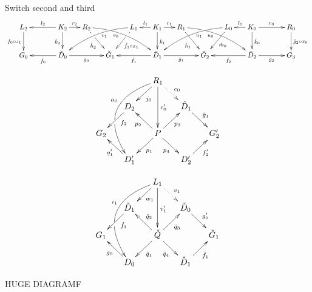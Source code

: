 	
	Switch second and third
\[\xymatrix@C=15pt{L_2\ar[d]_{f_0\circ z_1}&& K_2 \ar[d]_{\mathring{k}_2}\ar[ll]_{l_2} \ar[r]^{r_2} & R_2 \ar@/^.35cm/[drrr]_(.4){v_0}|(.285)\hole \ar[dr]|(.28)\hole_{\mathring{h}_2} && L_1 \ar@/_.35cm/[dlll]^(.4){v_1} \ar[dl]|(.28)\hole^{\mathring{f}_1 \circ x_1}& K_1 \ar[d]^{\mathring{k}_1}\ar[l]_{l_1} \ar[r]^{r_1} & R_1 \ar@/^.35cm/[drrr]_(.4){u_0}|(.285)\hole\ar[dr]_{\check{h}_1}   && L_0 \ar@/_.35cm/[dlll]^(.4){u_1} \ar[dl]^{\mathring{m}_0}& K_0 \ar[d]^{\mathring{k}_0}\ar[l]_{l_0} \ar[rr]^{r_0} && R_0\ar[d]^{\check{g}_2\circ x_0} \\G_0 && \ar[ll]^{\check{f}_0} \check{D}_0 \ar[rr]_{\check{g}_0}&& \check{G}_1  && \ar[ll]^{\bar{f}_1} \bar{D}_1 \ar[rr]_{\bar{g}_1}&& \bar{G}_2 && \ar[ll]^{\bar{f}_2} \bar{D}_2 \ar[rr]_{\bar{g}_2}&& G_3 }\]

\[\xymatrix@R=15pt@C=15pt{&&R_1 \ar@/_1.2cm/[dddl]_(.4){a_0}|(.63)\hole\ar[dl]^{j_0}\ar[dd]^{c'_0} \ar@{.>}[dr]^{c_0}\\&D_2 \ar[dl]^(.4){f_2}&&\hat{D}_1 \ar[dr]^{\hat{g}_1}\\G_2 && P\ar[dr]_{p_4} \ar[ur]_{p_3}\ar[dl]^{p_1} \ar[ul]^{p_2}&&G'_2\\& D'_1 \ar[ul]^{g'_1}&&D'_2 \ar[ur]_{f'_2}}\]

\[\xymatrix@R=15pt@C=15pt{&&L_1 \ar[dl]^{w_1} \ar@/_1.2cm/[dddl]_(.4){i_1}|(.63)\hole\ar[dd]^{v'_1} \ar@{.>}[dr]^{v_1}\\&\check{D}_1 \ar[dl]^(.4){\check{f}_1}&&\check{D}_0 \ar[dr]^{g'_0}\\G_1 && \check{Q}\ar[dr]_{\check{q}_4} \ar[ur]_{\check{q}_3}\ar[dl]^{\check{q}_1} \ar[ul]_{\check{q}_2}&&\check{G}_1\\& D_0 \ar[ul]^{g_0}&&\mathring{D}_1 \ar[ur]_{\check{f}_1}}\]




HUGE DIAGRAMF


